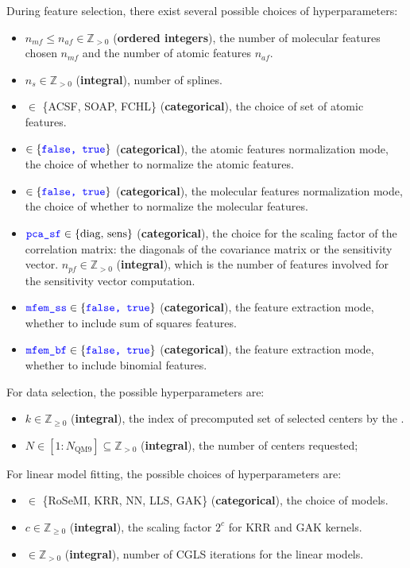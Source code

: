 \documentclass[12pt]{article}
\begin{document}
During feature selection, there exist several possible choices of hyperparameters:
\begin{itemize}
	\item $n_{mf} \leq n_{af} \in \mathbb{Z}_{>0}$ (\textbf{ordered integers}), the number of molecular features chosen $n_{mf}$ and the number of atomic features $n_{af}$.
	\item $n_{s}\in \mathbb{Z}_{>0}$ (\textbf{integral}), number of splines.
	\item {} $\in$ \{ACSF, SOAP, FCHL\} (\textbf{categorical}), the choice of set of atomic features.
	\item {} $ \in \{\codeword{false, true}\}$ (\textbf{categorical}), the atomic features normalization mode, the choice of whether to normalize the atomic features.
	\item {} $ \in \{\codeword{false, true}\}$ (\textbf{categorical}), the molecular features normalization mode, the choice of whether to normalize the molecular features.
	\item $\codeword{pca_sf} \in \{\text{diag, sens}\}$ (\textbf{categorical}), the choice for the scaling factor of the correlation matrix: the diagonals of the covariance matrix or the sensitivity vector.  $n_{pf} \in \mathbb{Z}_{>0}$ (\textbf{integral}), which is the number of features involved for the sensitivity vector computation.	
	\item $\codeword{mfem_ss} \in \{\codeword{false, true}\}$ (\textbf{categorical}), the feature extraction mode, whether to include sum of squares features.
	\item $\codeword{mfem_bf} \in \{\codeword{false, true}\}$ (\textbf{categorical}), the feature extraction mode, whether to include binomial features.
\end{itemize}
For data selection, the possible hyperparameters are:
\begin{itemize}
	\item $k \in \mathbb{Z}_{\geq 0}$ (\textbf{integral}), the index of precomputed set of selected centers by the .
	\item $N \in [1 : N_\text{QM9}] \subseteq \mathbb{Z}_{>0}$ (\textbf{integral}), the number of centers requested;
\end{itemize}
For linear model fitting, the possible choices of hyperparameters are:
\begin{itemize}
	\item {} $\in$ \{RoSeMI, KRR, NN, LLS, GAK\} (\textbf{categorical}), the choice of models.
	\item $c \in \mathbb{Z}_{\geq0}$ (\textbf{integral}), the scaling factor $2^c$ for KRR and GAK kernels.
	\item {} $\in \mathbb{Z}_{>0}$ (\textbf{integral}), number of CGLS iterations for the linear models.
\end{itemize}
\end{document}
